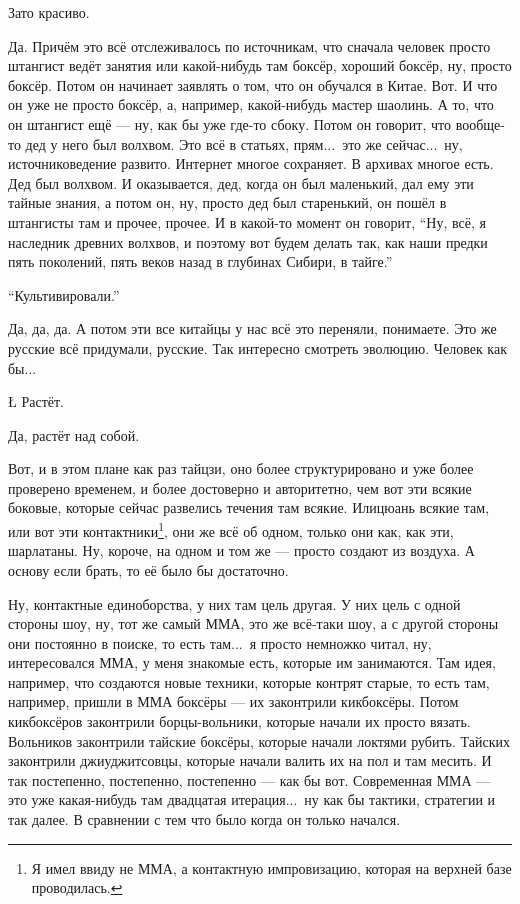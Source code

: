 \N
Зато красиво.

\A
Да. Причём это всё отслеживалось по источникам,
что сначала человек просто штангист
ведёт занятия
или какой-ни\-будь там боксёр,
хороший боксёр, ну, просто боксёр.
Потом он
начинает заявлять о том, что он
обучался в Китае.
Вот. И что он
уже не просто боксёр, а, например,
какой-нибудь мастер шаолинь.
А то, что он штангист
ещё --- ну, как бы
уже где-то сбоку.
Потом он говорит, что вообще-то
дед у него был
волхвом. Это всё
в статьях, прям...\ это же сейчас...\
ну, источниковедение
развито. Интернет многое сохраняет.
В архивах многое есть.
Дед был волхвом.
И оказывается, дед, когда он был
маленький, дал ему
эти тайные знания, а потом
он, ну, просто дед был старенький,
он пошёл в штангисты там и прочее,
прочее. И в какой-то
момент он говорит, ``Ну, всё, я наследник древних
волхвов, и поэтому
вот будем делать так, как
наши предки пять
поколений, пять веков назад
в глубинах Сибири,
в тайге.''

\N
``Культивировали.''

\A
Да, да, да.
А потом эти все китайцы у нас всё это
переняли, понимаете. Это же русские
всё придумали, русские.
Так интересно смотреть эволюцию.
Человек
как бы...

\L
Растёт.

\A
Да, растёт над собой.

\I
Вот, и в этом плане как раз
тайцзи, оно более
структурировано и уже более проверено
временем, и более
достоверно и авторитетно,
чем вот эти всякие боковые, которые
сейчас развелись течения там всякие.
Илицюань
всякие там, или вот эти
контактники\footnote*{Я имел ввиду не ММА, а контактную импровизацию,
которая на верхней базе проводилась.}, они же всё об одном, только
они как, как эти,
шарлатаны. Ну, короче,
на одном и том же --- просто
создают из воздуха.
А основу если брать,
то её было бы достаточно.

\A
Ну,
контактные единоборства,
у них там
цель другая. У них цель
с одной стороны шоу,
ну, тот же самый ММА,
это же всё-таки шоу,
а с другой стороны они
постоянно в поиске,
то есть там...\ я просто
немножко читал, ну,
интересовался ММА,
у меня знакомые есть, которые им занимаются.
Там идея, например, что
создаются новые техники,
которые контрят старые,
то есть там, например,
пришли в ММА боксёры ---
их законтрили
кикбоксёры. Потом
кикбоксёров законтрили
борцы-вольники,
которые начали их просто вязать.
Вольников законтрили тайские
боксёры, которые начали локтями
рубить. Тайских законтрили
джиуджитсовцы,
которые начали
валить их на пол и там месить.
И так постепенно, постепенно, постепенно ---
как бы вот.
Современная ММА ---
это уже какая-нибудь
там двадцатая итерация...\
ну как бы тактики,
стратегии и так далее.
В сравнении с тем что было
когда он только начался.

